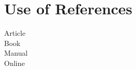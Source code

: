 \chapter{Use of References}

\cite{exampleArticle} Article
\\
\cite{exampleBook} Book
\\
\cite{exampleManual} Manual
\\
\cite{exampleOnline} Online